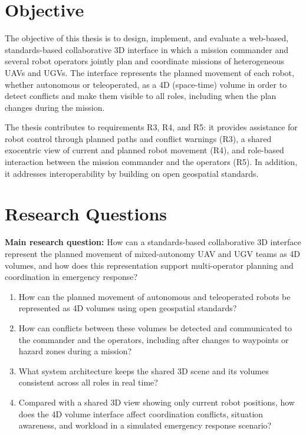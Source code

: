 \documentclass{article}
\begin{document}
\section{Objective}
The objective of this thesis is to design, implement, and evaluate a web-based, standards-based collaborative 3D interface in which a mission commander and several robot operators jointly plan and coordinate missions of heterogeneous UAVs and UGVs.
The interface represents the planned movement of each robot, whether autonomous or teleoperated, as a 4D (space-time) volume in order to detect conflicts and make them visible to all roles, including when the plan changes during the mission.

The thesis contributes to requirements R3, R4, and R5: it provides assistance for robot control through planned paths and conflict warnings (R3), a shared exocentric view of current and planned robot movement (R4), and role-based interaction between the mission commander and the operators (R5). In addition, it addresses interoperability by building on open geospatial standards.

\section{Research Questions}
\textbf{Main research question:} How can a standards-based collaborative 3D interface represent the planned movement of mixed-autonomy UAV and UGV teams as 4D volumes, and how does this representation support multi-operator planning and coordination in emergency response?

\begin{enumerate}[label=\textbf{RQ\arabic*}]
  \item How can the planned movement of autonomous and teleoperated robots be represented as 4D volumes using open geospatial standards?
  \item How can conflicts between these volumes be detected and communicated to the commander and the operators, including after changes to waypoints or hazard zones during a mission?
  \item What system architecture keeps the shared 3D scene and its volumes consistent across all roles in real time?
  \item Compared with a shared 3D view showing only current robot positions, how does the 4D volume interface affect coordination conflicts, situation awareness, and workload in a simulated emergency response scenario?
\end{enumerate}


\newpage


\end{document}
